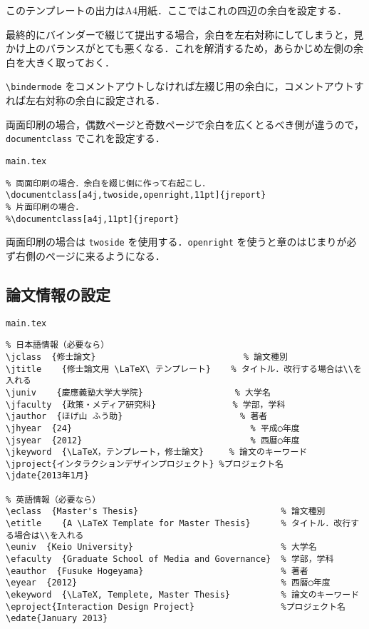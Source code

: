 このテンプレートの出力はA4用紙．ここではこれの四辺の余白を設定する．

最終的にバインダーで綴じて提出する場合，余白を左右対称にしてしまうと，見かけ上のバランスがとても悪くなる．これを解消するため，あらかじめ左側の余白を大きく取っておく．

\verb|\bindermode| をコメントアウトしなければ左綴じ用の余白に，コメントアウトすれば左右対称の余白に設定される．

両面印刷の場合，偶数ページと奇数ページで余白を広くとるべき側が違うので，\verb|documentclass| でこれを設定する．

\begin{itembox}[l]{\texttt{main.tex}}
\begin{verbatim}
% 両面印刷の場合．余白を綴じ側に作って右起こし．
\documentclass[a4j,twoside,openright,11pt]{jreport}
% 片面印刷の場合．
%\documentclass[a4j,11pt]{jreport}
\end{verbatim}
\end{itembox}

両面印刷の場合は \texttt{twoside} を使用する．\texttt{openright} を使うと章のはじまりが必ず右側のページに来るようになる．

\subsection{論文情報の設定}
\label{sec:meta}

\begin{itembox}[l]{\texttt{main.tex}}
\begin{verbatim}
% 日本語情報（必要なら）
\jclass  {修士論文}                             % 論文種別
\jtitle    {修士論文用 \LaTeX\ テンプレート}    % タイトル．改行する場合は\\を入れる
\juniv    {慶應義塾大学大学院}                  % 大学名
\jfaculty  {政策・メディア研究科}               % 学部，学科
\jauthor  {ほげ山 ふう助}                       % 著者
\jhyear  {24}                                   % 平成○年度
\jsyear  {2012}                                 % 西暦○年度
\jkeyword  {\LaTeX，テンプレート，修士論文}     % 論文のキーワード
\jproject{インタラクションデザインプロジェクト} %プロジェクト名
\jdate{2013年1月}

% 英語情報（必要なら）
\eclass  {Master's Thesis}                            % 論文種別
\etitle    {A \LaTeX Template for Master Thesis}      % タイトル．改行する場合は\\を入れる
\euniv  {Keio University}                             % 大学名
\efaculty  {Graduate School of Media and Governance}  % 学部，学科
\eauthor  {Fusuke Hogeyama}                           % 著者
\eyear  {2012}                                        % 西暦○年度
\ekeyword  {\LaTeX, Templete, Master Thesis}          % 論文のキーワード
\eproject{Interaction Design Project}                 %プロジェクト名
\edate{January 2013}
\end{verbatim}
\end{itembox}

